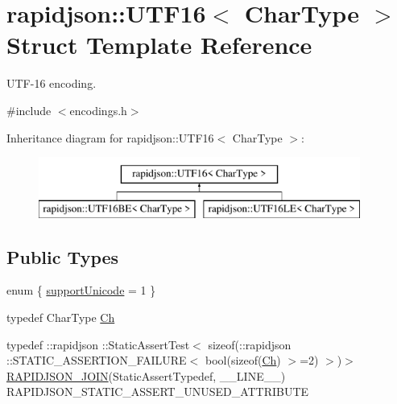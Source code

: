 \hypertarget{structrapidjson_1_1_u_t_f16}{}\section{rapidjson\+::U\+T\+F16$<$ Char\+Type $>$ Struct Template Reference}
\label{structrapidjson_1_1_u_t_f16}


U\+T\+F-\/16 encoding.  




{\ttfamily \#include $<$encodings.\+h$>$}

Inheritance diagram for rapidjson\+::U\+T\+F16$<$ Char\+Type $>$\+:\begin{figure}[H]
\begin{center}
\leavevmode
\includegraphics[height=2.000000cm]{structrapidjson_1_1_u_t_f16}
\end{center}
\end{figure}
\subsection*{Public Types}
\begin{DoxyCompactItemize}
\item 
enum \{ \mbox{\hyperlink{structrapidjson_1_1_u_t_f16_a439e1dc4701cc7ae34d257ce76f5dc37a5a09bf086fb94e4d6fb106da7c3f01ea}{support\+Unicode}} = 1
 \}
\item 
typedef Char\+Type \mbox{\hyperlink{structrapidjson_1_1_u_t_f16_acb67f53501b796b55996352a6080da54}{Ch}}
\item 
typedef \+::rapidjson \+::Static\+Assert\+Test$<$ sizeof(\+::rapidjson \+::S\+T\+A\+T\+I\+C\+\_\+\+A\+S\+S\+E\+R\+T\+I\+O\+N\+\_\+\+F\+A\+I\+L\+U\+RE$<$ bool(sizeof(\mbox{\hyperlink{structrapidjson_1_1_u_t_f16_acb67f53501b796b55996352a6080da54}{Ch}}) $>$=2) $>$)$>$ \mbox{\hyperlink{structrapidjson_1_1_u_t_f16_a504bdaba3bbc5345c15b6e44f708f994}{R\+A\+P\+I\+D\+J\+S\+O\+N\+\_\+\+J\+O\+IN}}(Static\+Assert\+Typedef, \+\_\+\+\_\+\+L\+I\+N\+E\+\_\+\+\_\+) R\+A\+P\+I\+D\+J\+S\+O\+N\+\_\+\+S\+T\+A\+T\+I\+C\+\_\+\+A\+S\+S\+E\+R\+T\+\_\+\+U\+N\+U\+S\+E\+D\+\_\+\+A\+T\+T\+R\+I\+B\+U\+TE
\end{DoxyCompactItemize}
